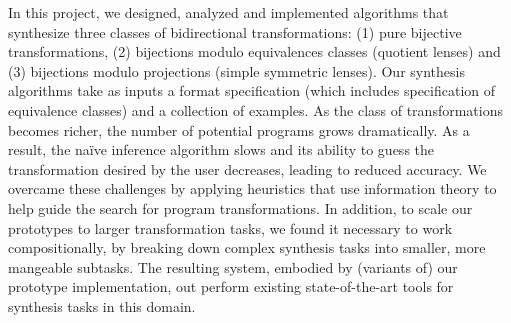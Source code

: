 \documentclass[12pt]{article}
\begin{document}
{In this project, we designed, analyzed and implemented algorithms that
synthesize three classes of bidirectional transformations: (1) pure
bijective transformations, (2) bijections modulo equivalences classes
(quotient lenses) and (3) bijections modulo projections (simple symmetric
lenses).  Our synthesis algorithms take as inputs a format specification
(which includes specification of equivalence classes) and a collection of
examples.  As the class of transformations becomes richer, the number of
potential programs grows dramatically.  As a result, the na\"{i}ve
inference algorithm slows and its ability to guess the transformation
desired by the user decreases, leading to reduced accuracy.  We overcame
these challenges by applying heuristics that use information theory to help
guide the search for program transformations.  In addition, to scale our
prototypes to larger transformation tasks, we found it necessary to work
compositionally, by breaking down complex synthesis tasks into smaller, more
mangeable subtasks.  The resulting system, embodied by (variants of) our
prototype \Optician{} implementation, out perform existing state-of-the-art
tools for synthesis tasks in this domain.




}
\end{document}
